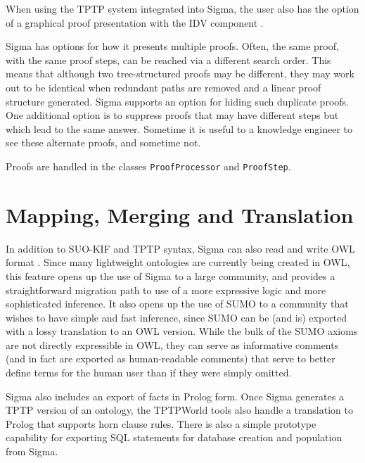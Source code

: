 \documentclass{book}
\begin{document}
\begin{sloppypar}
When using the TPTP system integrated into Sigma, the user also has the option
of a graphical proof presentation with the IDV component \cite{trac2007}.
\end{sloppypar}

Sigma has options for how it presents multiple proofs. Often, the same proof,
with the same proof steps, can be reached via a different search order. This
means that although two tree-structured proofs may be different, they may work
out to be identical when redundant paths are removed and a linear proof
structure generated. Sigma supports an option for hiding such duplicate proofs.
One additional option is to suppress proofs that may have different steps but
which lead to the same answer. Sometime it is useful to a knowledge engineer to
see these alternate proofs, and sometime not.

Proofs are handled in the classes
\texttt{ProofProcessor} and
\texttt{ProofStep}.


\section{Mapping, Merging and Translation}
\label{chap:KnowEngi:sec:Mapp}

In addition to SUO-KIF and TPTP syntax, Sigma can also read and write OWL format
\cite{bechhofer2004owl}. Since many lightweight ontologies are currently being
created in OWL, this feature opens up the use of Sigma to a large community, and
provides a straightforward migration path to use of a more expressive logic and
more sophisticated inference.  It also opens up the use of SUMO to a community
that wishes to have simple and fast inference, since SUMO can be (and is)
exported with a lossy translation to an OWL version.  While the bulk of the SUMO
axioms are not directly expressible in OWL, they can serve as informative
comments (and in fact are exported as human-readable comments) that serve to
better define terms for the human user than if they were simply omitted.

Sigma also includes an export of facts in Prolog form.  Once Sigma
generates a TPTP version of an ontology, the TPTPWorld tools also handle a
translation to Prolog that supports horn clause rules. There is also a simple
prototype capability for exporting SQL statements for database creation and
population from Sigma.
\end{document}
